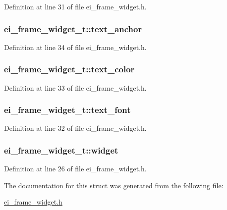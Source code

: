Definition at line 31 of file ei\-\_\-frame\-\_\-widget.\-h.

\hypertarget{structei__frame__widget__t_a47ce58b9e3c67b6567a9b7739e217111}{
\subsubsection[{text\-\_\-anchor}]{ ei\-\_\-frame\-\_\-widget\-\_\-t\-::text\-\_\-anchor}}\label{structei__frame__widget__t_a47ce58b9e3c67b6567a9b7739e217111}


Definition at line 34 of file ei\-\_\-frame\-\_\-widget.\-h.

\hypertarget{structei__frame__widget__t_aecc7c627bf739528388dd0b97fd4ec6c}{
\subsubsection[{text\-\_\-color}]{ ei\-\_\-frame\-\_\-widget\-\_\-t\-::text\-\_\-color}}\label{structei__frame__widget__t_aecc7c627bf739528388dd0b97fd4ec6c}


Definition at line 33 of file ei\-\_\-frame\-\_\-widget.\-h.

\hypertarget{structei__frame__widget__t_a3832154ce5fe1aec4eb4bc372a05158a}{
\subsubsection[{text\-\_\-font}]{ ei\-\_\-frame\-\_\-widget\-\_\-t\-::text\-\_\-font}}\label{structei__frame__widget__t_a3832154ce5fe1aec4eb4bc372a05158a}


Definition at line 32 of file ei\-\_\-frame\-\_\-widget.\-h.

\hypertarget{structei__frame__widget__t_a89903d2fb772642f95987d3faf1494e0}{
\subsubsection[{widget}]{ ei\-\_\-frame\-\_\-widget\-\_\-t\-::widget}}\label{structei__frame__widget__t_a89903d2fb772642f95987d3faf1494e0}


Definition at line 26 of file ei\-\_\-frame\-\_\-widget.\-h.



The documentation for this struct was generated from the following file\-:\begin{DoxyCompactItemize}
\item 
\hyperlink{ei__frame__widget_8h}{ei\-\_\-frame\-\_\-widget.\-h}\end{DoxyCompactItemize}
